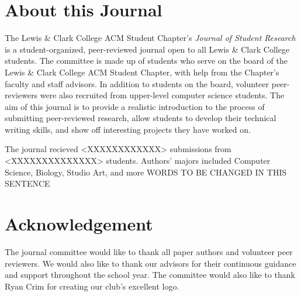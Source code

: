 \documentclass[12pt, letterpaper]{article}
\begin{document}
\section{About this Journal}
The Lewis \& Clark College ACM Student Chapter's \textit{Journal of Student Research} is a student-organized, peer-reviewed journal open to all Lewis \& Clark College students. The committee is made up of students who serve on the board of the Lewis \& Clark College ACM Student Chapter, with help from the Chapter's faculty and staff advisors. In addition to students on the board, volunteer peer-reviewers were also recruited from upper-level computer science students. The aim of this journal is to provide a realistic introduction to the process of submitting peer-reviewed research, allow students to develop their technical writing skills, and show off interesting projects they have worked on.

The journal recieved <XXXXXXXXXXXX> submissions from <XXXXXXXXXXXXXX> students. Authors' majors included Computer Science, Biology, Studio Art, and more WORDS TO BE CHANGED IN THIS SENTENCE


\section{Acknowledgement}

The journal committee would like to thank all paper authors and volunteer peer reviewers. We would also like to thank our advisors for their continuous guidance and support throughout the school year. The committee would also like to thank Ryan Crim for creating our club's excellent logo.

\newpage
\end{document}
